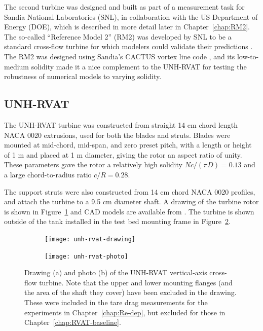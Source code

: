 The second turbine was designed and built as part of a measurement task for
Sandia National Laboratories (SNL), in collaboration with the US Department of
Energy (DOE), which is described in more detail later in Chapter~\ref{chap:RM2}.
The so-called ``Reference Model 2'' (RM2) was developed by SNL to be a standard
cross-flow turbine for which modelers could validate their predictions
\cite{Neary2014}. The RM2 was designed using Sandia's CACTUS vortex line code
\cite{Barone2011}, and its low-to-medium solidity made it a nice complement to
the UNH-RVAT for testing the robustness of numerical models to varying solidity.


\subsection{UNH-RVAT}

The UNH-RVAT turbine was constructed from straight 14 cm chord length NACA 0020
extrusions, used for both the blades and struts. Blades were mounted at
mid-chord, mid-span, and zero preset pitch, with a length or height of 1 m and
placed at 1 m diameter, giving the rotor an aspect ratio of unity. These
parameters gave the rotor a relatively high solidity $Nc/(\pi D) = 0.13$ and a
large chord-to-radius ratio $c/R = 0.28$.

The support struts were also constructed from 14 cm chord NACA 0020 profiles,
and attach the turbine to a 9.5 cm diameter shaft. A drawing of the turbine
rotor is shown in Figure~\ref{fig:rvat-drawing} and CAD models are available
from \cite{Bachant2014-RVAT-CAD}. The turbine is shown outside of the tank
installed in the test bed mounting frame in Figure~\ref{fig:rvat-photo}.

\begin{figure}
    \centering
    \begin{subfigure}{0.49\textwidth}
        \texttt{[image: unh-rvat-drawing]}
        \caption{}
        \label{fig:rvat-drawing}
    \end{subfigure}
    \begin{subfigure}{0.47\textwidth}
        \texttt{[image: unh-rvat-photo]}
        \caption{}
        \label{fig:rvat-photo}
    \end{subfigure}
    
    \caption{Drawing (a) and photo (b) of the UNH-RVAT vertical-axis cross-flow
        turbine. Note that the upper and lower mounting flanges (and the area of the
        shaft they cover) have been excluded in the drawing. These were included in
        the tare drag measurements for the experiments in Chapter~\ref{chap:Re-dep},
        but excluded for those in Chapter~\ref{chap:RVAT-baseline}.}
    
    \label{fig:unh-rvat}
\end{figure}


